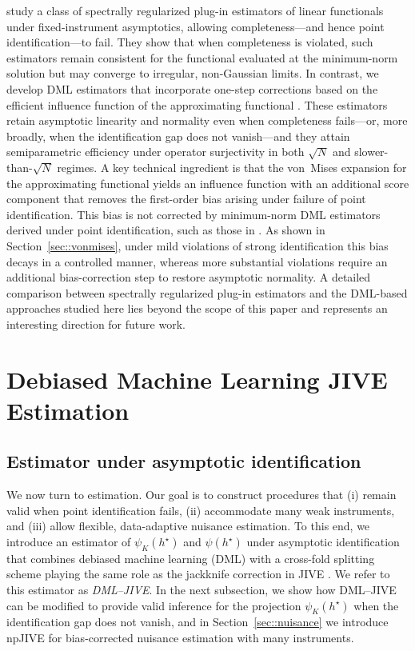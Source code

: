 \documentclass[11pt]{article}
\theoremstyle{plain}
\theoremstyle{definition}
\theoremstyle{remark}
\theoremstyle{definition}
\begin{document}
\citet{babii2020completeness} study a
class of spectrally regularized plug-in estimators of linear functionals under
fixed-instrument asymptotics, allowing completeness---and hence point
identification---to fail. They show that when completeness is violated, such
estimators remain consistent for the functional evaluated at the minimum-norm
solution but may converge to irregular, non-Gaussian limits. In contrast, we
develop DML estimators that incorporate one-step corrections based on the
efficient influence function of the approximating functional
\citep{bickel1993efficient}. These estimators retain asymptotic linearity and
normality even when completeness fails---or, more broadly, when the
identification gap does not vanish---and they attain semiparametric efficiency
under operator surjectivity in both $\sqrt{N}$ and slower-than-$\sqrt{N}$
regimes. A key technical ingredient is that the von~Mises expansion for the
approximating functional yields an influence function with an additional score
component that removes the first-order bias arising under failure of point
identification. This bias is not corrected by minimum-norm DML estimators
derived under point identification, such as those in
\citet{bennett2023inference, bennett2023source}. As shown in
Section~\ref{sec::vonmises}, under mild violations of strong identification this
bias decays in a controlled manner, whereas more substantial violations require
an additional bias-correction step to restore asymptotic normality. A detailed comparison between spectrally regularized plug-in estimators and the
DML-based approaches studied here lies beyond the scope of this paper and
represents an interesting direction for future work.


 
\section{Debiased Machine Learning JIVE Estimation}
\label{sec::estimatorsall}

\subsection{Estimator under asymptotic identification}
\label{sec::estimators}

We now turn to estimation. Our goal is to construct procedures that (i) remain
valid when point identification fails, (ii) accommodate many weak instruments,
and (iii) allow flexible, data-adaptive nuisance estimation. To this end, we
introduce an estimator of \(\psi_K(h^\star)\) and \(\psi(h^\star)\) under
asymptotic identification that combines debiased machine learning (DML)
\citep{vanderLaanRose2011, DoubleML} with a cross-fold splitting scheme playing
the same role as the jackknife correction in JIVE \citep{angrist1999jackknife}.
We refer to this estimator as \emph{DML--JIVE}. In the next subsection, we show
how DML--JIVE can be modified to provide valid inference for the projection
\(\psi_K(h^\star)\) when the identification gap does not vanish, and in
Section~\ref{sec::nuisance} we introduce npJIVE for bias-corrected nuisance
estimation with many instruments.
\end{document}
